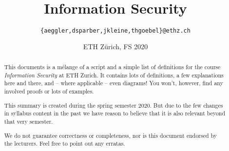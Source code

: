 \documentclass[paper=a4, parskip=half-]{scrartcl}
\title{Information Security}
\author{\texttt{\{aeggler,dsparber,jkleine,thgoebel\}@ethz.ch}}
\date{ETH Zürich, FS 2020}
\begin{document}
\begin{titlepage}
\maketitle
\vspace{5cm}
\thispagestyle{empty}


\begin{abstract}
This documents is a mélange of a script and a simple list of definitions for the course \textit{Information Security} at ETH Zurich. It contains lots of definitions, a few explanations here and there, and -- where applicable -- even diagrams! You won't, however, find any involved proofs or lots of examples.

This summary is created during the spring semester 2020. But due to the few changes in syllabus content in the past we have reason to believe that it is also relevant beyond that very semester.

We do not guarantee correctness or completeness, nor is this document endorsed by the lecturers. Feel free to point out any erratas.
\end{abstract}

\end{titlepage}

\tableofcontents
\newpage


\newpage


\newpage


\end{document}
